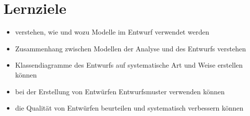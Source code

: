 \section{Lernziele}
\begin{itemize}
    \item verstehen, wie und wozu Modelle im Entwurf verwendet werden
    \item Zusammenhang zwischen Modellen der Analyse und des Entwurfs verstehen
    \item Klassendiagramme des Entwurfs auf systematische Art und Weise erstellen können
    \item bei der Erstellung von Entwürfen Entwurfsmuster verwenden können
    \item die Qualität von Entwürfen beurteilen und systematisch verbessern können
\end{itemize}